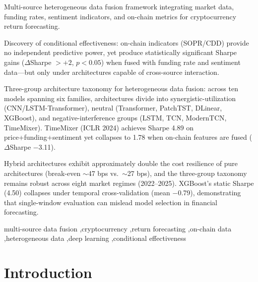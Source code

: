 \documentclass[a4paper]{cas-dc}
\begin{document}
\begin{highlights}
\item Multi-source heterogeneous data fusion framework integrating market data, funding rates, sentiment indicators, and on-chain metrics for cryptocurrency return forecasting.
\item Discovery of conditional effectiveness: on-chain indicators (SOPR/CDD) provide no independent predictive power, yet produce statistically significant Sharpe gains ($\Delta$Sharpe $>+2$, $p<0.05$) when fused with funding rate and sentiment data---but only under architectures capable of cross-source interaction.
\item Three-group architecture taxonomy for heterogeneous data fusion: across ten models spanning six families, architectures divide into synergistic-utilization (CNN/LSTM-Transformer), neutral (Transformer, PatchTST, DLinear, XGBoost), and negative-interference groups (LSTM, TCN, ModernTCN, TimeMixer). TimeMixer (ICLR 2024) achieves Sharpe 4.89 on price+funding+sentiment yet collapses to 1.78 when on-chain features are fused ($\Delta$Sharpe $-$3.11).
\item Hybrid architectures exhibit approximately double the cost resilience of pure architectures (break-even $\sim$47 bps vs.\ $\sim$27 bps), and the three-group taxonomy remains robust across eight market regimes (2022--2025). XGBoost's static Sharpe (4.50) collapses under temporal cross-validation (mean $-$0.79), demonstrating that single-window evaluation can mislead model selection in financial forecasting.
\end{highlights}

\begin{keywords}
multi-source data fusion \sep cryptocurrency \sep return forecasting \sep on-chain data \sep heterogeneous data \sep deep learning \sep conditional effectiveness
\end{keywords}

\maketitle

\setlength{\emergencystretch}{1em}

\section{Introduction}
\end{document}
